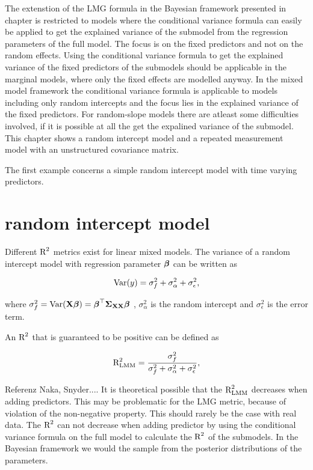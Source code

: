 \documentclass[11pt,a4paper,twoside]{book}\usepackage[]{graphicx}\usepackage[]{color}
\begin{document}
The extenstion of the LMG formula in the Bayesian framework presented in chapter is restricted to models where the conditional variance formula can easily be applied to get the explained variance of the submodel from the regression parameters of the full model. The focus is on the fixed predictors and not on the random effects. Using the conditional variance formula to get the explained variance of the fixed predictors of the submodels should be applicable in the marginal models, where only the fixed effects are modelled anyway. In the mixed model framework the conditional variance formula is applicable to models including only random intercepts and the focus lies in the explained variance of the fixed predictors. For random-slope models there are atleast some difficulties involved, if it is possible at all the get the expalined variance of the submodel. This chapter shows a  random intercept model and a repeated measurement model with an unstructured covariance matrix.  

The first example concerns a simple random intercept model with time varying predictors.  

\section{random intercept model}

Different $\text{R}^2$ metrics exist for linear mixed models. The variance of a random intercept model with regression parameter ${\boldsymbol{\beta}}$ can be written as

      \begin{align} 
        \operatorname{Var}(y) = \sigma_{f}^2  + \sigma_{\alpha}^2 + \sigma_{\epsilon}^2, 
        \end{align}

where $\sigma_{f}^2 = \operatorname{Var}({\mathbf{X}} {\boldsymbol{\beta}}) = {\boldsymbol{\beta}}^\top {\boldsymbol{\Sigma}}{}_{{\mathbf{X}} {\mathbf{X}}}  {\boldsymbol{\beta}}$ , $\sigma_{\alpha}^2 $ is the random intercept and $\sigma_{\epsilon}^2$ is the error term. 

An $\text{R}^2$ that is guaranteed to be positive can be defined as

   \begin{align} 
\text{R}^2_{\text{LMM}} = \frac{\sigma_{f}^2}{\sigma_{f}^2 + \sigma_{\alpha}^2 + \sigma_{\epsilon}^2},
\end{align}

Referenz Naka, Snyder.... It is theoretical possible that the $\text{R}^2_{\text{LMM}}$ decreases when adding predictors. This may be problematic for the LMG metric, because of violation of the non-negative property. This should rarely be the case with real data. The $\text{R}^2$ can not decrease when adding predictor by using the conditional variance formula on the full model to calculate the $\text{R}^2$ of the submodels. In the Bayesian framework we would the sample from the posterior distributions of the parameters. 
\end{document}
